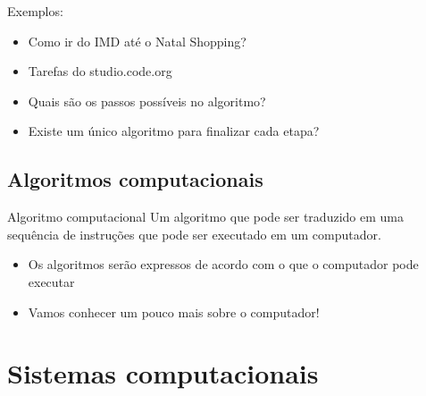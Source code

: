 \documentclass[portuguese,10pt,xcolor=table]{bredelebeamer}
\begin{document}
	\begin{frame}
	\small
Exemplos:
\begin{itemize}
\item Como ir do IMD até o Natal Shopping?
\item Tarefas do studio.code.org
\end{itemize}


	\vspace{1cm}
		\begin{itemize}
		\item Quais são os passos possíveis no algoritmo?
		\item Existe um único algoritmo para finalizar cada etapa?
		\end{itemize}
	\end{frame}

\subsection{Algoritmos computacionais}

	\begin{frame}
		\begin{center}
			\structure{\Huge \insertsubsection}
		\end{center}
	\end{frame} 

	\begin{frame} 
		\begin{beamerboxesrounded}{Algoritmo computacional}
		Um algoritmo que pode ser traduzido em uma sequência de instruções que pode ser executado em um computador.
		\end{beamerboxesrounded}
	\end{frame}

	\begin{frame} 
		\begin{itemize}
		\item Os algoritmos serão expressos de acordo com o que o computador pode executar
		\item Vamos conhecer um pouco mais sobre o computador!
		\end{itemize}
	\end{frame}


\section{Sistemas computacionais}

	\begin{frame}
		\begin{center}
			\structure{\Huge \insertsection}
		\end{center}
	\end{frame} 
\end{document}
